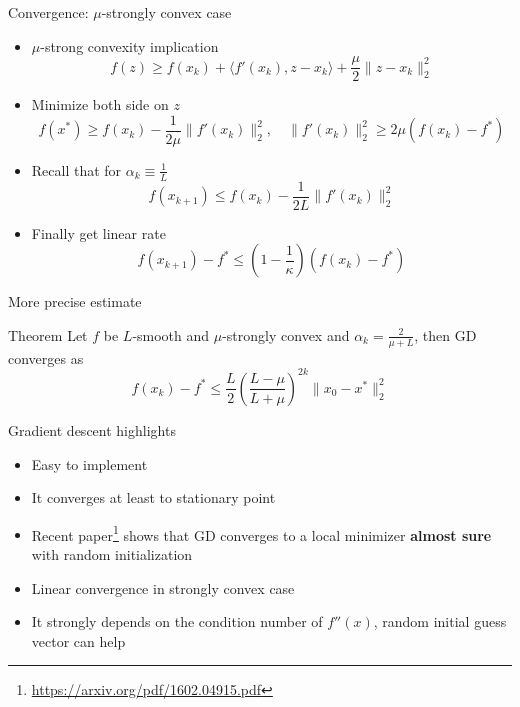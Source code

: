 \documentclass{beamer}
\begin{document}
\begin{frame}{Convergence: $\mu$-strongly convex case}
\begin{itemize}
\item $\mu$-strong convexity implication
\[
f(z) \geq f(x_k) + \langle f'(x_k), z - x_k \rangle + \frac{\mu}{2}\| z - x_k \|_2^2
\]
\item Minimize both side on $z$
\[
f(x^*) \geq f(x_k) - \frac{1}{2\mu} \|f'(x_k)\|_2^2, \quad \|f'(x_k)\|_2^2 \geq 2\mu (f(x_k) - f^*)
\]
\item Recall that for $\alpha_k \equiv \frac{1}{L}$
\[
f(x_{k+1}) \leq f(x_k) - \frac{1}{2L}\|f'(x_k)\|_2^2
\]
\item Finally get linear rate
\[
f(x_{k+1}) - f^* \leq \left( 1 - \frac{1}{\kappa}\right) (f(x_k) - f^*)
\]
\end{itemize}
\end{frame}

\begin{frame}{More precise estimate}
\begin{block}{Theorem}
Let $f$ be $L$-smooth and $\mu$-strongly convex and $\alpha_k = \frac{2}{\mu + L}$, then GD converges as
\[
f(x_k) - f^* \leq \frac{L}{2}\left( \frac{L - \mu}{L + \mu} \right)^{2k} \|x_0 - x^*\|^2_2
\]
\end{block}
\end{frame}

\begin{frame}{Gradient descent highlights}
\begin{itemize}
\item Easy to implement
\item It converges at least to stationary point
\item Recent paper\footnote{\url{https://arxiv.org/pdf/1602.04915.pdf}} shows that GD converges to a local minimizer \textbf{almost sure} with random initialization
\item Linear convergence in strongly convex case
\item It strongly depends on the condition number of $f''(x)$, random initial guess vector can help
\end{itemize}
\end{frame}
\end{document}
